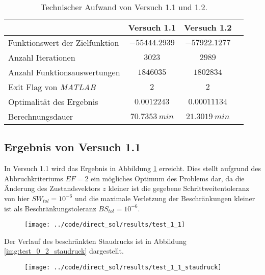 \begin{table}[H]
    \centering
    \caption{Technischer Aufwand von Versuch 1.1 und 1.2.}\label{tab:Versuch1_TA}
    \begin{tabularx}{.9\textwidth}{Zccc}
        \toprule
         & \textbf{Versuch 1.1} & \textbf{Versuch 1.2} \\
        \midrule
        Funktionswert der Zielfunktion & $-55444.2939$ & $-57922.1277$ \\
        Anzahl Iterationen & $3023$ & $2989$ \\
        Anzahl Funktionsauswertungen & $1846035$ & $1802834$ \\
        Exit Flag von \textit{MATLAB} & $2$ & $2$ \\
        Optimalität des Ergebnis & $0.0012243$ & $0.00011134$ \\
        Berechnungsdauer & $70.7353 \ min$ & $21.3019 \ min$ \\
        \bottomrule
    \end{tabularx}
\end{table}




\subsection{Ergebnis von Versuch 1.1}\label{kap:Versuch11}
In Versuch 1.1 wird das Ergebnis in Abbildung \ref{img:test_1_1} erreicht. Dies stellt aufgrund des Abbruchkriteriums $EF = 2$ ein mögliches Optimum des Problems dar, da die Änderung des Zustandsvektors $z$ kleiner ist die gegebene Schrittweitentoleranz von hier $SW_{tol} = 10^{-6}$ und die maximale Verletzung der Beschränkungen kleiner ist als Beschränkungstoleranz $BS_{tol} = 10^{-6}$.
\begin{figure}[H]
\begin{center}
\texttt{[image: ../code/direct\_sol/results/test\_1\_1]}
 \label{img:test_1_1}
\end{center}
\end{figure}
Der Verlauf des beschränkten Staudrucks ist in Abbildung \ref{img:test_0_2_staudruck} dargestellt.
\begin{figure}[H]
\begin{center}
\texttt{[image: ../code/direct\_sol/results/test\_1\_1\_staudruck]}
 \label{img:test_1_1_staudruck}
\end{center}
\end{figure}




